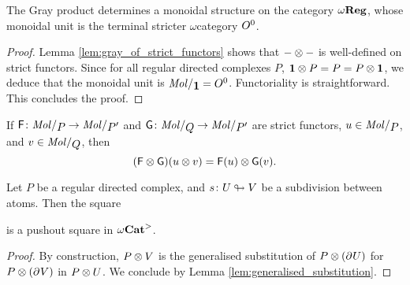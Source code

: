 \begin{cor} \label{cor:gray_prodcut_omegareg_monoidal}
    The Gray product determines a monoidal structure on the category \( \omega\mathbf{Reg} \), whose monoidal unit is the terminal stricter \( \omega \)\nbd category \( O^{0} \).
\end{cor}
\begin{proof}
    Lemma \ref{lem:gray_of_strict_functors} shows that \( - \otimes - \) is well-defined on strict functors. 
    Since for all regular directed complexes \( P \), \( \mathbf{1} \otimes P = P = P \otimes \mathbf{1} \), we deduce that the monoidal unit is \( \molecin{\pt} = \globe{0} \).
    Functoriality is straightforward.
    This concludes the proof.
\end{proof}

\begin{rmk}
    If \( \F \colon \molecin{P} \to \molecin{P'} \) and \( \G \colon \molecin{Q} \to \molecin{P'} \) are strict functors, \( u \in \molecin{P} \), and \( v \in \molecin{Q} \), then 
    \begin{equation*}
       (\mathsf{F} \otimes \mathsf{G})(u \otimes v) = \mathsf{F}(u) \otimes \mathsf{G}(v). 
    \end{equation*}
\end{rmk}

\begin{lem} \label{lem:rewrite_condition_for_gray}
    Let \( P \) be a regular directed complex, and \( s \colon U \looparrowright V \) be a subdivision between atoms.
    Then the square
    \begin{center}
    \end{center}
    is a pushout square in \( {\omega\mathbf{Cat}}^> \).
\end{lem}
\begin{proof}
    By construction, \( P \otimes V \) is the generalised substitution of \( P \otimes (\partial_{}^{} U) \) for \( P \otimes (\partial_{}^{} V) \) in \( P \otimes U \).
    We conclude by Lemma \ref{lem:generalised_substitution}.
\end{proof}

